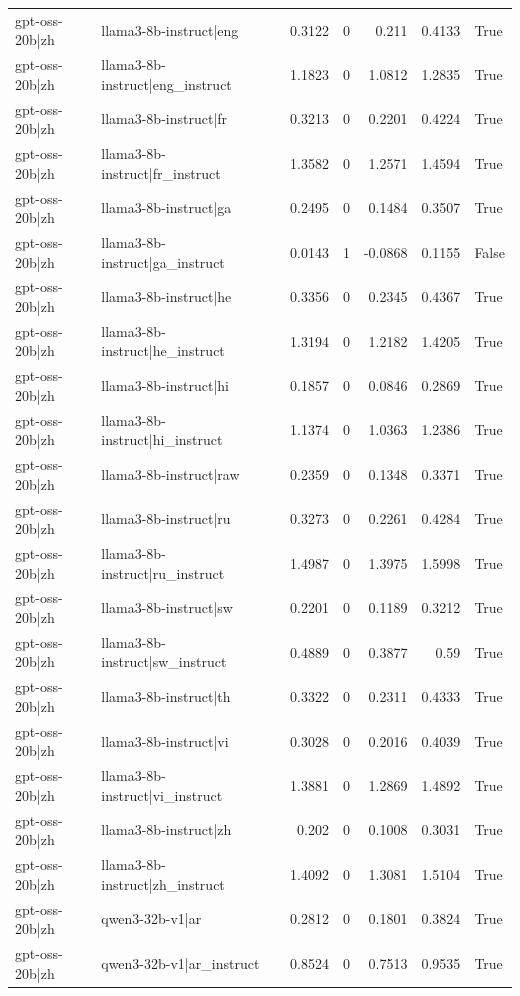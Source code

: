 \begin{table}
\begin{tabular}{l l r r r r l}
gpt-oss-20b|zh & llama3-8b-instruct|eng & 0.3122 & 0 & 0.211 & 0.4133 & True \\
gpt-oss-20b|zh & llama3-8b-instruct|eng_instruct & 1.1823 & 0 & 1.0812 & 1.2835 & True \\
gpt-oss-20b|zh & llama3-8b-instruct|fr & 0.3213 & 0 & 0.2201 & 0.4224 & True \\
gpt-oss-20b|zh & llama3-8b-instruct|fr_instruct & 1.3582 & 0 & 1.2571 & 1.4594 & True \\
gpt-oss-20b|zh & llama3-8b-instruct|ga & 0.2495 & 0 & 0.1484 & 0.3507 & True \\
gpt-oss-20b|zh & llama3-8b-instruct|ga_instruct & 0.0143 & 1 & -0.0868 & 0.1155 & False \\
gpt-oss-20b|zh & llama3-8b-instruct|he & 0.3356 & 0 & 0.2345 & 0.4367 & True \\
gpt-oss-20b|zh & llama3-8b-instruct|he_instruct & 1.3194 & 0 & 1.2182 & 1.4205 & True \\
gpt-oss-20b|zh & llama3-8b-instruct|hi & 0.1857 & 0 & 0.0846 & 0.2869 & True \\
gpt-oss-20b|zh & llama3-8b-instruct|hi_instruct & 1.1374 & 0 & 1.0363 & 1.2386 & True \\
gpt-oss-20b|zh & llama3-8b-instruct|raw & 0.2359 & 0 & 0.1348 & 0.3371 & True \\
gpt-oss-20b|zh & llama3-8b-instruct|ru & 0.3273 & 0 & 0.2261 & 0.4284 & True \\
gpt-oss-20b|zh & llama3-8b-instruct|ru_instruct & 1.4987 & 0 & 1.3975 & 1.5998 & True \\
gpt-oss-20b|zh & llama3-8b-instruct|sw & 0.2201 & 0 & 0.1189 & 0.3212 & True \\
gpt-oss-20b|zh & llama3-8b-instruct|sw_instruct & 0.4889 & 0 & 0.3877 & 0.59 & True \\
gpt-oss-20b|zh & llama3-8b-instruct|th & 0.3322 & 0 & 0.2311 & 0.4333 & True \\
gpt-oss-20b|zh & llama3-8b-instruct|vi & 0.3028 & 0 & 0.2016 & 0.4039 & True \\
gpt-oss-20b|zh & llama3-8b-instruct|vi_instruct & 1.3881 & 0 & 1.2869 & 1.4892 & True \\
gpt-oss-20b|zh & llama3-8b-instruct|zh & 0.202 & 0 & 0.1008 & 0.3031 & True \\
gpt-oss-20b|zh & llama3-8b-instruct|zh_instruct & 1.4092 & 0 & 1.3081 & 1.5104 & True \\
gpt-oss-20b|zh & qwen3-32b-v1|ar & 0.2812 & 0 & 0.1801 & 0.3824 & True \\
gpt-oss-20b|zh & qwen3-32b-v1|ar_instruct & 0.8524 & 0 & 0.7513 & 0.9535 & True \\

\end{tabular}
\end{table}

